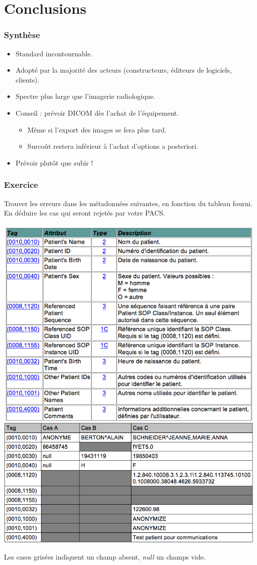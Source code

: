 \section{Conclusions}

\frame
{
	\frametitle{Synth\`ese}
	
	\begin{itemize}
		\item Standard incontournable.
		\item<2-> Adopt\'e par la majorit\'e des acteurs (constructeurs, \'editeurs de logiciels, clients).
		\item<3-> Spectre plus large que l'imagerie radiologique.
		\item<4-> Conseil : pr\'evoir DICOM d\`es l'achat de l'\'equipement.
		\begin{itemize}
			\item<5-> M\^eme si l'export des images se fera plus tard.
			\item<6-> Surco\^ut restera inf\'erieur \`a l'achat d'options a posteriori.
		\end{itemize}
		\item<7-> Pr\'evoir plut\^ot que subir !
	\end{itemize}
}

\frame
{
    \frametitle{Exercice}
    Trouver les erreurs dans les m\'etadonn\'ees suivantes, en fonction du tableau fourni.
    En d\'eduire les cas qui seront rejet\'es par votre PACS.

	\includegraphics[width=.5\linewidth]{./figures/table.png}
	\includegraphics[width=.5\linewidth]{./figures/metadata-cases.png}
    
    Les cases gris\'ees indiquent un champ absent, \emph{null} un champs vide.
}

